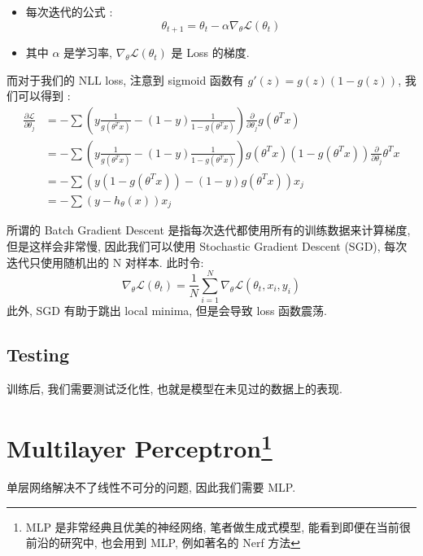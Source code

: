 \begin{definition}
    \begin{itemize}
        \item 每次迭代的公式 :
        $$\theta_{t+1} = \theta_t - \alpha \nabla_{\theta} \mathcal{L}(\theta_t)$$
        \item 其中 $\alpha$ 是学习率, $\nabla_{\theta} \mathcal{L}(\theta_t)$ 是 Loss 的梯度.
    \end{itemize}
\end{definition}

\begin{note}
而对于我们的 NLL loss, 注意到 sigmoid 函数有 $g'(z) = g(z)(1-g(z))$, 我们可以得到 :
$$\begin{aligned}\frac{\partial\mathcal{L}}{\partial\theta_{j}}&=-\sum\left(y\frac1{g(\theta^Tx)}-(1-y)\frac1{1-g(\theta^Tx)}\right)\frac\partial{\partial\theta_j}g(\theta^Tx)\\&=-\sum\left(y\frac1{g(\theta^Tx)}-(1-y)\frac1{1-g(\theta^Tx)}\right)g(\theta^Tx)(1-g(\theta^Tx))\frac\partial{\partial\theta_j}\theta^Tx\\&=-\sum\left(y(1-g(\theta^Tx))-(1-y)g(\theta^Tx)\right)x_j\\&=-\sum\left(y-h_\theta(x)\right)x_j\end{aligned}
$$
\end{note}
\begin{theorem}
    所谓的 Batch Gradient Descent 是指每次迭代都使用所有的训练数据来计算梯度, 但是这样会非常慢, 因此我们可以使用 Stochastic Gradient Descent (SGD), 每次迭代只使用随机出的 N 对样本. 此时令:
    $$\nabla_{\theta} \mathcal{L}(\theta_t) = \frac{1}{N}\sum_{i=1}^N \nabla_{\theta} \mathcal{L}(\theta_t, x_i, y_i)$$
    此外, SGD 有助于跳出 local minima, 但是会导致 loss 函数震荡.
\end{theorem}

\subsection{Testing}
训练后, 我们需要测试泛化性, 也就是模型在未见过的数据上的表现.

\section{Multilayer Perceptron\footnote{MLP 是非常经典且优美的神经网络, 笔者做生成式模型, 能看到即便在当前很前沿的研究中, 也会用到 MLP, 例如著名的 Nerf 方法}}
\begin{note}
    单层网络解决不了线性不可分的问题, 因此我们需要 MLP. 
\end{note}

